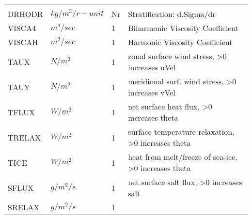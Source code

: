\begin{tabular}{llll}
\begin{minipage}[t]{3in}
         \end{minipage}\\
 DRHODR   & $kg/m^3/{r-unit}$ & Nr
         &\begin{minipage}[t]{3in}
          {Stratification: d.Sigma/dr} 
         \end{minipage}\\
 VISCA4   & $m^4/sec$ & 1
         &\begin{minipage}[t]{3in}
          {Biharmonic Viscosity Coefficient} 
         \end{minipage}\\
 VISCAH   & $m^2/sec$ & 1
         &\begin{minipage}[t]{3in}
          {Harmonic Viscosity Coefficient} 
         \end{minipage}\\
 TAUX     & $N/m^2        $ & 1 
         &\begin{minipage}[t]{3in}
          {zonal surface wind stress, >0 increases uVel}
         \end{minipage}\\
 TAUY     & $N/m^2        $ & 1 
         &\begin{minipage}[t]{3in}
          {meridional surf. wind stress, >0 increases vVel}
         \end{minipage}\\
 TFLUX    & $W/m^2        $ & 1 
         &\begin{minipage}[t]{3in}
          {net surface heat flux, >0 increases theta}
         \end{minipage}\\
 TRELAX   & $W/m^2        $ & 1 
         &\begin{minipage}[t]{3in}
          {surface temperature relaxation, >0 increases theta}
         \end{minipage}\\
 TICE     & $W/m^2        $ & 1 
         &\begin{minipage}[t]{3in}
          {heat from melt/freeze of sea-ice, >0 increases theta}
         \end{minipage}\\
 SFLUX    & $g/m^2/s      $ & 1 
         &\begin{minipage}[t]{3in}
          {net surface salt flux, >0 increases salt}
         \end{minipage}\\
 SRELAX   & $g/m^2/s      $ & 1 
         &\begin{minipage}[t]{3in}

\end{minipage}
\end{tabular}
